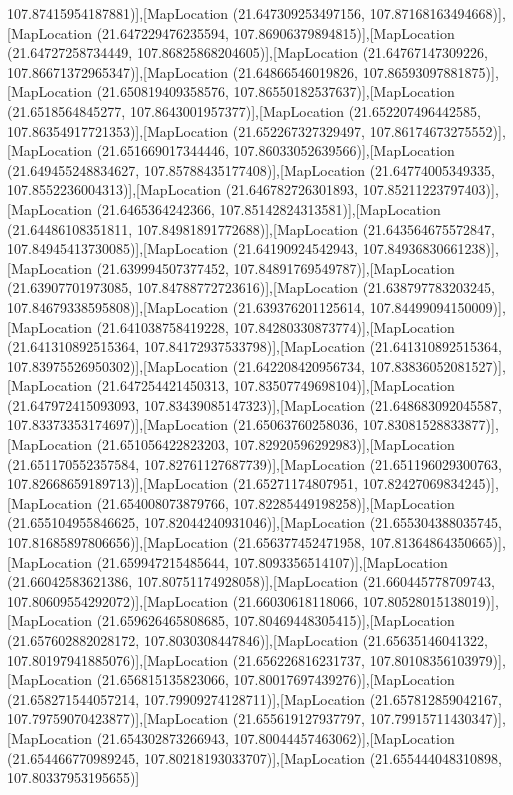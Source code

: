 107.87415954187881)],[MapLocation (21.647309253497156, 107.87168163494668)],[MapLocation (21.647229476235594, 107.86906379894815)],[MapLocation (21.64727258734449, 107.86825868204605)],[MapLocation (21.64767147309226, 107.86671372965347)],[MapLocation (21.64866546019826, 107.86593097881875)],[MapLocation (21.650819409358576, 107.86550182537637)],[MapLocation (21.6518564845277, 107.8643001957377)],[MapLocation (21.652207496442585, 107.86354917721353)],[MapLocation (21.652267327329497, 107.86174673275552)],[MapLocation (21.651669017344446, 107.86033052639566)],[MapLocation (21.649455248834627, 107.85788435177408)],[MapLocation (21.64774005349335, 107.8552236004313)],[MapLocation (21.646782726301893, 107.85211223797403)],[MapLocation (21.6465364242366, 107.85142824313581)],[MapLocation (21.64486108351811, 107.84981891772688)],[MapLocation (21.643564675572847, 107.84945413730085)],[MapLocation (21.64190924542943, 107.84936830661238)],[MapLocation (21.639994507377452, 107.84891769549787)],[MapLocation (21.63907701973085, 107.84788772723616)],[MapLocation (21.638797783203245, 107.84679338595808)],[MapLocation (21.639376201125614, 107.84499094150009)],[MapLocation (21.641038758419228, 107.84280330873774)],[MapLocation (21.641310892515364, 107.84172937533798)],[MapLocation (21.641310892515364, 107.83975526950302)],[MapLocation (21.642208420956734, 107.83836052081527)],[MapLocation (21.647254421450313, 107.83507749698104)],[MapLocation (21.647972415093093, 107.83439085147323)],[MapLocation (21.648683092045587, 107.83373353174697)],[MapLocation (21.65063760258036, 107.83081528833877)],[MapLocation (21.651056422823203, 107.82920596292983)],[MapLocation (21.651170552357584, 107.82761127687739)],[MapLocation (21.651196029300763, 107.82668659189713)],[MapLocation (21.65271174807951, 107.82427069834245)],[MapLocation (21.654008073879766, 107.82285449198258)],[MapLocation (21.655104955846625, 107.82044240931046)],[MapLocation (21.655304388035745, 107.81685897806656)],[MapLocation (21.656377452471958, 107.81364864350665)],[MapLocation (21.659947215485644, 107.8093356514107)],[MapLocation (21.66042583621386, 107.80751174928058)],[MapLocation (21.660445778709743, 107.80609554292072)],[MapLocation (21.66030618118066, 107.80528015138019)],[MapLocation (21.659626465808685, 107.80469448305415)],[MapLocation (21.657602882028172, 107.8030308447846)],[MapLocation (21.65635146041322, 107.80197941885076)],[MapLocation (21.656226816231737, 107.80108356103979)],[MapLocation (21.656815135823066, 107.80017697439276)],[MapLocation (21.658271544057214, 107.79909274128711)],[MapLocation (21.657812859042167, 107.79759070423877)],[MapLocation (21.655619127937797, 107.79915711430347)],[MapLocation (21.654302873266943, 107.80044457463062)],[MapLocation (21.654466770989245, 107.80218193033707)],[MapLocation (21.655444048310898, 107.80337953195655)]